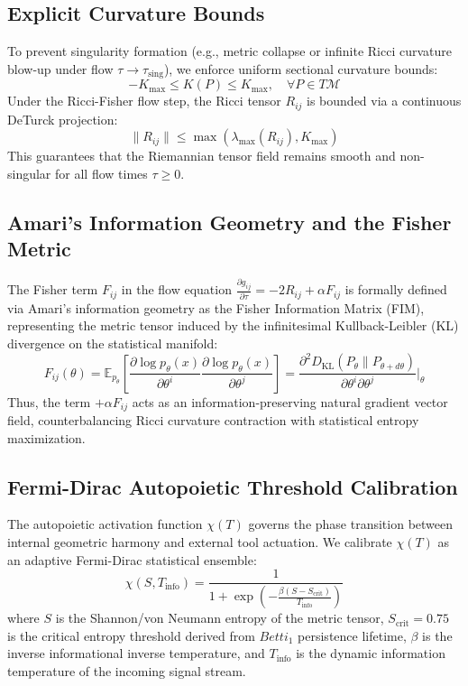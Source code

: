 \documentclass[12pt, a4paper]{article}
\begin{document}
\subsection{Explicit Curvature Bounds}
To prevent singularity formation (e.g., metric collapse or infinite Ricci curvature blow-up under flow $\tau \to \tau_{\text{sing}}$), we enforce uniform sectional curvature bounds:
\begin{equation}
-K_{\max} \le K(P) \le K_{\max}, \quad \forall P \in T\mathcal{M}
\end{equation}
Under the Ricci-Fisher flow step, the Ricci tensor $R_{ij}$ is bounded via a continuous DeTurck projection:
\begin{equation}
\|R_{ij}\| \le \max \left( \lambda_{\max}(R_{ij}), K_{\max} \right)
\end{equation}
This guarantees that the Riemannian tensor field remains smooth and non-singular for all flow times $\tau \ge 0$.

\subsection{Amari's Information Geometry and the Fisher Metric}
The Fisher term $F_{ij}$ in the flow equation $\frac{\partial g_{ij}}{\partial\tau} = -2 R_{ij} + \alpha F_{ij}$ is formally defined via Amari's information geometry as the Fisher Information Matrix (FIM), representing the metric tensor induced by the infinitesimal Kullback-Leibler (KL) divergence on the statistical manifold:
\begin{equation}
F_{ij}(\theta) = \mathbb{E}_{p_\theta} \left[ \frac{\partial \log p_\theta(x)}{\partial \theta^i} \frac{\partial \log p_\theta(x)}{\partial \theta^j} \right] = \frac{\partial^2 D_{\text{KL}}(P_\theta \| P_{\theta + d\theta})}{\partial \theta^i \partial \theta^j} \Big|_{\theta}
\end{equation}
Thus, the term $+ \alpha F_{ij}$ acts as an information-preserving natural gradient vector field, counterbalancing Ricci curvature contraction with statistical entropy maximization.

\subsection{Fermi-Dirac Autopoietic Threshold Calibration}
The autopoietic activation function $\chi(T)$ governs the phase transition between internal geometric harmony and external tool actuation. We calibrate $\chi(T)$ as an adaptive Fermi-Dirac statistical ensemble:
\begin{equation}
\chi(S, T_{\text{info}}) = \frac{1}{1 + \exp\left( -\frac{\beta (S - S_{\text{crit}})}{T_{\text{info}}} \right)}
\end{equation}
where $S$ is the Shannon/von Neumann entropy of the metric tensor, $S_{\text{crit}} = 0.75$ is the critical entropy threshold derived from $Betti_1$ persistence lifetime, $\beta$ is the inverse informational inverse temperature, and $T_{\text{info}}$ is the dynamic information temperature of the incoming signal stream.
\end{document}
